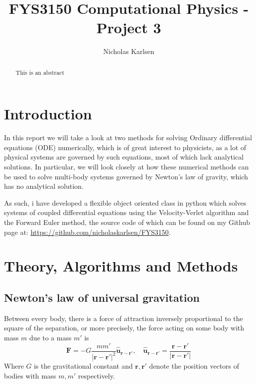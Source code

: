 \documentclass[10pt,showpacs,preprintnumbers,footinbib,amsmath,amssymb,aps,prl,twocolumn,groupedaddress,superscriptaddress,showkeys]{revtex4-1}
\begin{document}
\title{FYS3150 Computational Physics - Project 3}
\author{Nicholas Karlsen}


\begin{abstract}
This is an abstract
\end{abstract}

\maketitle


\section{Introduction}

  In this report we will take a look at two methods for solving Ordinary differential equations (ODE) numerically, which is of great interest to physicists, as a lot of physical systems are governed by such equations, most of which lack analytical solutions. In particular, we will look closely at how these numerical methods can be used to solve multi-body systems governed by Newton's law of gravity, which has no analytical solution.

  As such, i have developed a flexible object oriented class in python which solves systems of coupled differential equations using the Velocity-Verlet algorithm and the Forward Euler method, the source code of which can be found on my Github page at: \url{https://github.com/nicholaskarlsen/FYS3150}. 

\section{Theory, Algorithms and Methods}
  
  \subsection{Newton's law of universal gravitation}
    Between every body, there is a force of attraction inversely proportional to the square of the separation, or more precisely, the force acting on some body with mass $m$ due to a mass $m'$ is
    \begin{equation}
      \mathbf F = -G\frac{m m'}{|\mathbf r - \mathbf r'|^2}\mathbf{\hat{u}_{r-r'}}, \quad \mathbf{\hat{u}_{r-r'}} = \frac{\mathbf r - \mathbf r'}{\mathbf |\mathbf r - \mathbf r'|}
    \end{equation}
    Where $G$ is the gravitational constant and $\mathbf r, \mathbf r'$ denote the position vectors of bodies with mass $m, m'$ respectively.
\end{document}

